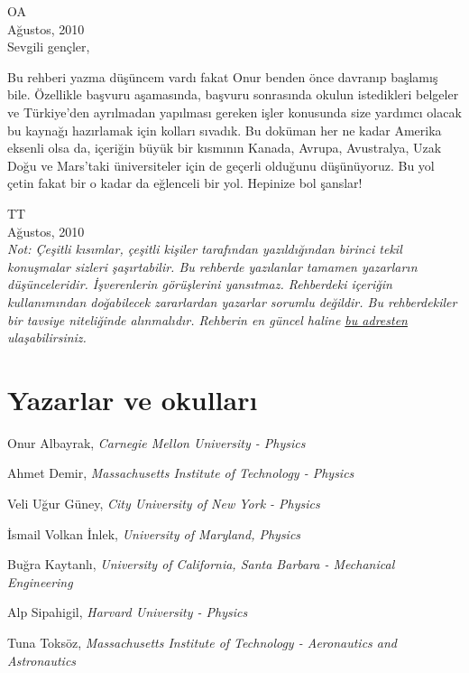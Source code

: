 \documentclass[12pt]{article}
\begin{document}
\noindent OA \\
Ağustos, 2010\\

\noindent Sevgili gençler, 

Bu rehberi yazma düşüncem vardı fakat Onur benden önce davranıp başlamış bile. Özellikle başvuru aşamasında, başvuru sonrasında okulun istedikleri belgeler ve Türkiye’den ayrılmadan yapılması gereken işler konusunda size yardımcı olacak bu kaynağı hazırlamak için kolları sıvadık. Bu doküman her ne kadar Amerika eksenli olsa da, içeriğin büyük bir kısmının Kanada, Avrupa, Avustralya, Uzak Doğu ve Mars’taki üniversiteler için de geçerli olduğunu düşünüyoruz. Bu yol çetin fakat bir o kadar da eğlenceli bir yol. Hepinize bol şanslar!

\noindent TT \\
Ağustos, 2010 \\

\textit{Not: Çeşitli kısımlar, çeşitli kişiler tarafından yazıldığından birinci tekil konuşmalar sizleri şaşırtabilir. Bu rehberde yazılanlar tamamen yazarların düşünceleridir. İşverenlerin görüşlerini yansıtmaz. Rehberdeki içeriğin kullanımından doğabilecek zararlardan yazarlar sorumlu değildir. Bu rehberdekiler bir tavsiye niteliğinde alınmalıdır.
Rehberin en güncel haline \href{https://github.com/yurtdisiphdrehberi/yurtdisiphdrehberi/}{bu adresten} ulaşabilirsiniz.}

\newpage
%
%
%
\section*{Yazarlar ve okulları}

Onur Albayrak, \textit{Carnegie Mellon University - Physics }

Ahmet Demir, \textit{Massachusetts Institute of Technology - Physics}

Veli Uğur Güney, \textit{City University of New York - Physics }

İsmail Volkan İnlek, \textit{University of Maryland, Physics}

Buğra Kaytanlı, \textit{University of California, Santa Barbara - Mechanical Engineering}

Alp Sipahigil, \textit{Harvard University - Physics }

Tuna Toksöz, \textit{Massachusetts Institute of Technology - Aeronautics and Astronautics }

\newpage
%
%
\end{document}
